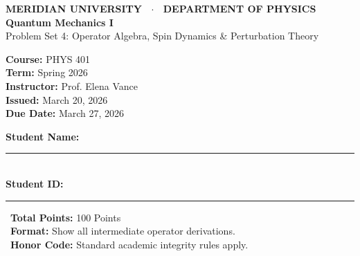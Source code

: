 \documentclass[11pt, a4paper, parskip=half]{scrartcl}
\begin{document}
\begin{tcolorbox}[
  enhanced,
  colback=QMPrimary,
  colframe=QMPrimary,
  arc=5pt,
  top=10pt, bottom=10pt, left=14pt, right=14pt
]
  \color{white}
  \begin{minipage}[t]{0.65\textwidth}
    {\sffamily\small\bfseries\color{QMTealBorder} MERIDIAN UNIVERSITY \ $\cdot$ \ DEPARTMENT OF PHYSICS} \\[3pt]
    {\sffamily\Huge\bfseries Quantum Mechanics I} \\[4pt]
    {\sffamily\large\color{QMBg} Problem Set 4: Operator Algebra, Spin Dynamics \& Perturbation Theory}
  \end{minipage}%
  \hfill
  \begin{minipage}[t]{0.30\textwidth}
    \raggedleft \sffamily \small
    \color{white}
    \textbf{Course:} PHYS 401 \\
    \textbf{Term:} Spring 2026 \\
    \textbf{Instructor:} Prof. Elena Vance \\
    \textbf{Issued:} March 20, 2026 \\
    \textbf{Due Date:} March 27, 2026
  \end{minipage}
\end{tcolorbox}

\vspace{1mm}

\begin{tcolorbox}[
  enhanced,
  colback=white,
  colframe=QMBorder,
  arc=4pt,
  boxrule=0.8pt,
  top=6pt, bottom=6pt, left=12pt, right=12pt
]
  \sffamily\small
  \begin{minipage}[c]{0.55\textwidth}
    \textbf{Student Name:} \rule{4.5cm}{0.4pt} \\[3pt]
    \textbf{Student ID:} \ \ \ \ \ \rule{4.5cm}{0.4pt}
  \end{minipage}%
  \hfill
  \begin{minipage}[c]{0.42\textwidth}
    \faClock\ \textbf{Total Points:} 100 Points \\
    \faFile\ \textbf{Format:} Show all intermediate operator derivations. \\
    \faLock\ \textbf{Honor Code:} Standard academic integrity rules apply.
  \end{minipage}
\end{tcolorbox}
\end{document}
